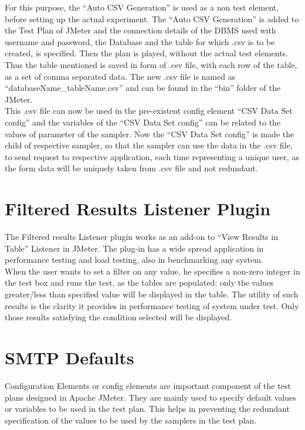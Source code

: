 \documentclass[12pt]{book}
\begin{document}
For this purpose, the ``Auto CSV Generation'' is used as a non test element, before setting
up the actual experiment. The ``Auto CSV Generation'' is added to the Test Plan of JMeter and
the connection details of the DBMS used with username and password, the Database and the
table for which .csv is to be created, is specified. Then the plan is played, without the actual test
elements.\\

Thus the table mentioned is saved in form of .csv file, with each row of the table, as a set
of comma separated data. The new .csv file is named as ``databaseName\_tableName.csv'' and can
be found in the ``bin'' folder of the JMeter.\\

This .csv file can now be used in the pre-existent config element ``CSV Data Set
config'' and the variables of the ``CSV Data Set config'' can be related to the values of parameter
of the sampler. Now the ``CSV Data Set config'' is made the child of respective sampler, so that
the sampler can use the data in the .csv file, to send request to respective application, each time
representing a unique user, as the form data will be uniquely taken from .csv file and not
redundant.\\

\section{Filtered Results Listener Plugin}
The Filtered results Listener plugin works as an add-on to ``View Results in Table''
Listener in JMeter. The plug-in has a wide spread application in performance testing and load
testing, also in benchmarking any system.\\

When the user wants to set a filter on any value, he specifies a non-zero integer in the test
box and runs the test, as the tables are populated; only the values greater/less than specified value
will be displayed in the table. The utility of such results is the clarity it provides in performance
testing of system under test. Only those results satisfying the condition selected will be
displayed.\cite{Manual}

\section{SMTP Defaults}
Configuration Elements or config elements are important component of the test plans designed in
Apache JMeter. They are mainly used to specify default values or variables to be used in the test
plan. This helps in preventing the redundant specification of the values to be used by the
samplers in the test plan.\\
\end{document}

